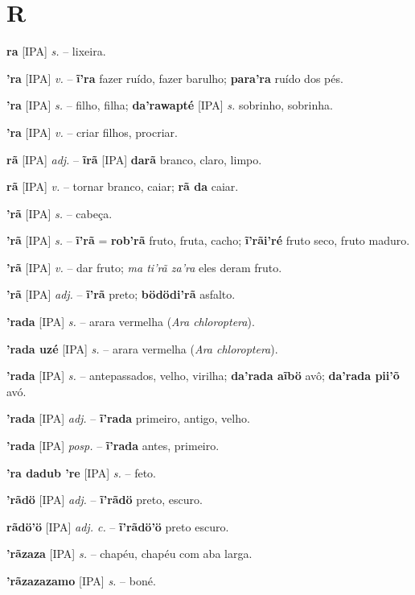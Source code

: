 \section*{R}



\textbf{ra} [IPA] \textit{s.} -- lixeira.

\textbf{'ra} [IPA] \textit{v.} -- \textbf{ĩ'ra} fazer ruído, fazer barulho; \textbf{para'ra} ruído dos pés.

\textbf{'ra} [IPA] \textit{s.} -- filho, filha; \textbf{da'rawapté} [IPA] \textit{s.} sobrinho, sobrinha.

\textbf{'ra} [IPA] \textit{v.} -- criar filhos, procriar.

\textbf{rã} [IPA] \textit{adj.} -- \textbf{ĩrã} [IPA] \textbf{darã} branco, claro, limpo.

\textbf{rã} [IPA] \textit{v.} -- tornar branco, caiar; \textbf{rã da} caiar.

\textbf{'rã} [IPA] \textit{s.} -- cabeça.

\textbf{'rã} [IPA] \textit{s.} -- \textbf{ĩ'rã} = \textbf{rob'rã} fruto, fruta, cacho; \textbf{ĩ'rãi'ré} fruto seco, fruto maduro.

\textbf{'rã} [IPA] \textit{v.} -- dar fruto; \textit{ma ti'rã za'ra} eles deram fruto.

\textbf{'rã} [IPA] \textit{adj.} -- \textbf{ĩ'rã} preto; \textbf{bödödi'rã} asfalto.

\textbf{'rada} [IPA] \textit{s.} -- arara vermelha (\textit{Ara chloroptera}).

\textbf{'rada uzé} [IPA] \textit{s.} -- arara vermelha (\textit{Ara chloroptera}).

\textbf{'rada} [IPA] \textit{s.} -- antepassados, velho, virilha; \textbf{da'rada aĩbö} avô; \textbf{da'rada pii'õ} avó.

\textbf{'rada} [IPA] \textit{adj.} -- \textbf{ĩ'rada} primeiro, antigo, velho.

\textbf{'rada} [IPA] \textit{posp.} -- \textbf{ĩ'rada} antes, primeiro.

\textbf{'ra dadub 're} [IPA] \textit{s.} -- feto.

\textbf{'rãdö} [IPA] \textit{adj.} -- \textbf{ĩ'rãdö} preto, escuro.

\textbf{rãdö'ö} [IPA] \textit{adj. c.} -- \textbf{ĩ'rãdö'ö} preto escuro.

\textbf{'rãzaza} [IPA] \textit{s.} -- chapéu, chapéu com aba larga.

\textbf{'rãzazazamo} [IPA] \textit{s.} -- boné.

